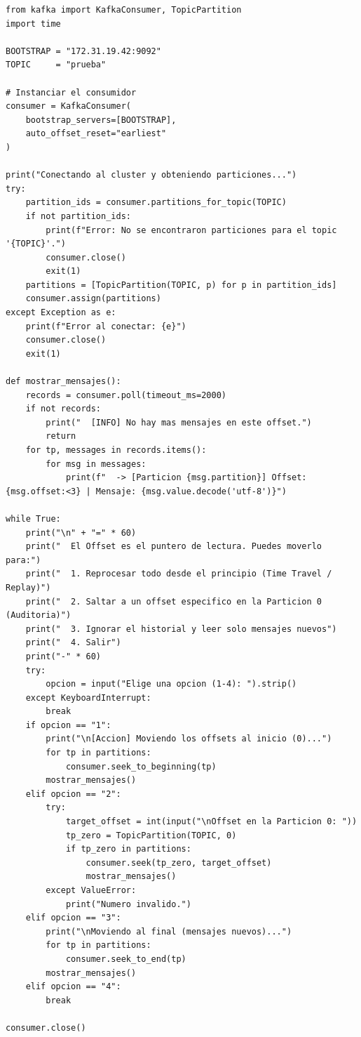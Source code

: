 \documentclass{practicaEPCC}
\begin{document}
\begin{lstlisting}[style=pythonstyle, caption={Demostración interactiva de manipulación de punteros (5\_offset\_demo.py)}]
from kafka import KafkaConsumer, TopicPartition
import time

BOOTSTRAP = "172.31.19.42:9092"
TOPIC     = "prueba"

# Instanciar el consumidor
consumer = KafkaConsumer(
    bootstrap_servers=[BOOTSTRAP],
    auto_offset_reset="earliest"
)

print("Conectando al cluster y obteniendo particiones...")
try:
    partition_ids = consumer.partitions_for_topic(TOPIC)
    if not partition_ids:
        print(f"Error: No se encontraron particiones para el topic '{TOPIC}'.")
        consumer.close()
        exit(1)
    partitions = [TopicPartition(TOPIC, p) for p in partition_ids]
    consumer.assign(partitions)
except Exception as e:
    print(f"Error al conectar: {e}")
    consumer.close()
    exit(1)

def mostrar_mensajes():
    records = consumer.poll(timeout_ms=2000)
    if not records:
        print("  [INFO] No hay mas mensajes en este offset.")
        return
    for tp, messages in records.items():
        for msg in messages:
            print(f"  -> [Particion {msg.partition}] Offset: {msg.offset:<3} | Mensaje: {msg.value.decode('utf-8')}")

while True:
    print("\n" + "=" * 60)
    print("  El Offset es el puntero de lectura. Puedes moverlo para:")
    print("  1. Reprocesar todo desde el principio (Time Travel / Replay)")
    print("  2. Saltar a un offset especifico en la Particion 0 (Auditoria)")
    print("  3. Ignorar el historial y leer solo mensajes nuevos")
    print("  4. Salir")
    print("-" * 60)
    try:
        opcion = input("Elige una opcion (1-4): ").strip()
    except KeyboardInterrupt:
        break
    if opcion == "1":
        print("\n[Accion] Moviendo los offsets al inicio (0)...")
        for tp in partitions:
            consumer.seek_to_beginning(tp)
        mostrar_mensajes()
    elif opcion == "2":
        try:
            target_offset = int(input("\nOffset en la Particion 0: "))
            tp_zero = TopicPartition(TOPIC, 0)
            if tp_zero in partitions:
                consumer.seek(tp_zero, target_offset)
                mostrar_mensajes()
        except ValueError:
            print("Numero invalido.")
    elif opcion == "3":
        print("\nMoviendo al final (mensajes nuevos)...")
        for tp in partitions:
            consumer.seek_to_end(tp)
        mostrar_mensajes()
    elif opcion == "4":
        break

consumer.close()
\end{lstlisting}
\end{document}
